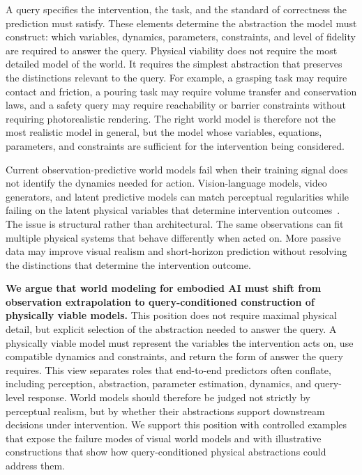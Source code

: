 \documentclass{article}
\begin{document}
A query specifies the intervention, the task, and the standard of correctness the prediction must satisfy. These elements determine the abstraction the model must construct: which variables, dynamics, parameters, constraints, and level of fidelity are required to answer the query. Physical viability does not require the most detailed model of the world. It requires the simplest abstraction that preserves the distinctions relevant to the query. For example, a grasping task may require contact and friction, a pouring task may require volume transfer and conservation laws, and a safety query may require reachability or barrier constraints without requiring photorealistic rendering. The right world model is therefore not the most realistic model in general, but the model whose variables, equations, parameters, and constraints are sufficient for the intervention being considered.

Current observation-predictive world models fail when their training signal does not identify the dynamics needed for action. Vision-language models, video generators, and latent predictive models can match perceptual regularities while failing on the latent physical variables that determine intervention outcomes~\cite{chow2025physbench,kang2024far,meng2024towards,guo2025t2vphysbench,gu2025phyworldbench,motamed2026generative,zhang2025morpheus,zhang2026physion}. The issue is structural rather than architectural. The same observations can fit multiple physical systems that behave differently when acted on. More passive data may improve visual realism and short-horizon prediction without resolving the distinctions that determine the intervention outcome.

\textbf{We argue that world modeling for embodied AI must shift from observation extrapolation to query-conditioned construction of physically viable models.} This position does not require maximal physical detail, but explicit selection of the abstraction needed to answer the query. A physically viable model must represent the variables the intervention acts on, use compatible dynamics and constraints, and return the form of answer the query requires. This view separates roles that end-to-end predictors often conflate, including perception, abstraction, parameter estimation, dynamics, and query-level response. World models should therefore be judged not strictly by perceptual realism, but by whether their abstractions support downstream decisions under intervention. We support this position with controlled examples that expose the failure modes of visual world models and with illustrative constructions that show how query-conditioned physical abstractions could address them.
\end{document}
